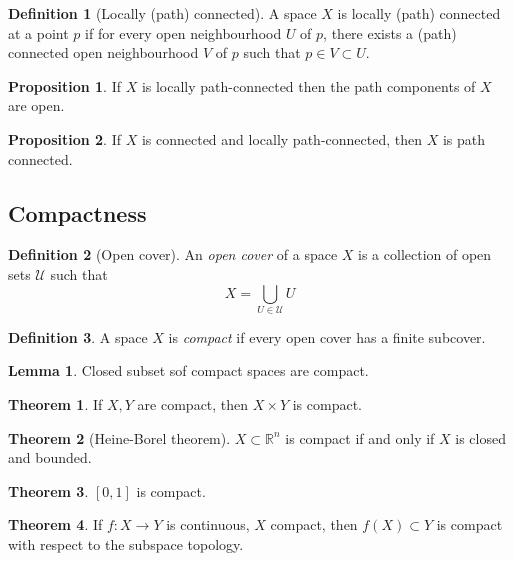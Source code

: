 \documentclass[a4paper,14pt]{extarticle}
\theoremstyle{definition}
\newtheorem*{theorem}{Theorem}
\newtheorem*{definition}{Definition}
\newtheorem*{lemma}{Lemma}
\newtheorem*{proposition}{Proposition}
\begin{document}
\begin{definition}[Locally (path) connected]
  A space $X$ is locally (path) connected at a point $p$ if for every open neighbourhood $U$ of $p$, 
  there exists a (path) connected open neighbourhood $V$ of $p$ such that $p\in V\subset U$.
\end{definition}

\begin{proposition}
  If $X$ is locally path-connected then the path components of $X$ are open.  
\end{proposition}

\begin{proposition}
  If $X$ is connected and locally path-connected, then $X$ is path connected.
\end{proposition}


\subsection{Compactness}
\begin{definition}[Open cover]
  An \emph{open cover} of a space $X$ is a collection of open sets $\mathcal{U}$ such that
  \[X=\bigcup_{U\in\mathcal{U}}U\]
\end{definition}

\begin{definition}
  A space $X$ is \emph{compact} if every open cover has a finite subcover.
\end{definition}

\begin{lemma}
  Closed subset sof compact spaces are compact.
\end{lemma}

\begin{theorem}
  If $X,Y$ are compact, then $X\times Y$ is compact.
\end{theorem}

\begin{theorem}[Heine-Borel theorem]
  $X\subset\mathbb{R}^n$ is compact if and only if $X$ is closed and bounded.
\end{theorem}

\begin{theorem}
  $[0,1]$ is compact.
\end{theorem}

\begin{theorem}
  If $f:X\rightarrow Y$ is continuous, $X$ compact, then $f(X)\subset Y$ is compact with respect to the subspace topology.
\end{theorem}
\end{document}
